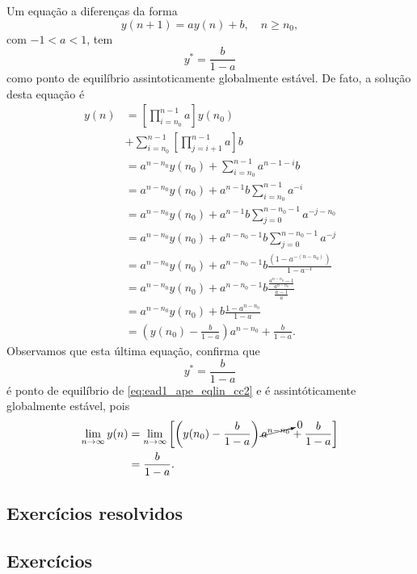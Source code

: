 Um equação a diferenças da forma
\begin{equation}\label{eq:ead1_ape_eqlin_cc2}
  y(n+1) = ay(n) + b,\quad n\geq n_0,
\end{equation}
com $-1<a<1$, tem
\begin{equation}
  y^* = \frac{b}{1-a}
\end{equation}
como ponto de equilíbrio assintoticamente globalmente estável. De fato, a solução desta equação é
\begin{align}
  y(n) &= \left[\prod_{i=n_0}^{n-1} a\right]y(n_0) \nonumber\\
       &+ \sum_{i=n_0}^{n-1}\left[\prod_{j=i+1}^{n-1} a\right]b \\
       &= a^{n-n_0}y(n_0) + \sum_{i=n_0}^{n-1}a^{n-1-i}b\\
       &= a^{n-n_0}y(n_0) + a^{n-1}b\sum_{i=n_0}^{n-1}a^{-i} \\
       &= a^{n-n_0}y(n_0) + a^{n-1}b\sum_{j=0}^{n-n_0-1}a^{-j-n_0}\\
       &= a^{n-n_0}y(n_0) + a^{n-n_0-1}b\sum_{j=0}^{n-n_0-1}a^{-j}\\
       &= a^{n-n_0}y(n_0) + a^{n-n_0-1}b\frac{(1-a^{-(n-n_0)})}{1-a^{-1}}\\
       &= a^{n-n_0}y(n_0) + a^{n-n_0-1}b\frac{\frac{a^{n-n_0}-1}{a^{n-n_0}}}{\frac{a-1}{a}}\\
       &= a^{n-n_0}y(n_0) + b\frac{1-a^{n-n_0}}{1-a} \\
       &= \left(y(n_0) - \frac{b}{1-a}\right)a^{n-n_0} + \frac{b}{1-a}.
\end{align}
Observamos que esta última equação, confirma que
\begin{equation}
  y^* = \frac{b}{1-a}
\end{equation}
é ponto de equilíbrio de \eqref{eq:ead1_ape_eqlin_cc2} e é assintóticamente globalmente estável, pois
\begin{align}
  \lim_{n\to\infty} y(n) &= \lim_{n\to\infty} \left[\left(y(n_0) - \frac{b}{1-a}\right)\cancelto{0}{a^{n-n_0}} + \frac{b}{1-a}\right] \\
                         &=  \frac{b}{1-a}.
\end{align}



\emconstrucao

\subsection*{Exercícios resolvidos}

\emconstrucao

\subsection*{Exercícios}

\emconstrucao